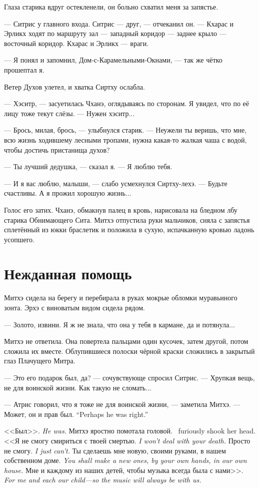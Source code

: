 Глаза старика вдруг остекленели, он больно схватил меня за запястье.

--- Ситрис у главного входа.
Ситрис --- друг, --- отчеканил он.
--- Кхарас и Эрликх ходят по маршруту зал --- западный коридор --- заднее крыло --- восточный коридор.
Кхарас и Эрликх --- враги.

--- Я понял и запомнил, Дом-с-Карамельными-Окнами, --- так же чётко прошептал я.

Ветер Духов улетел, и хватка Сиртху ослабла.

--- Хэситр, --- засуетилась Чханэ, оглядываясь по сторонам.
Я увидел, что по её лицу тоже текут слёзы.
--- Нужен хэситр...

--- Брось, милая, брось, --- улыбнулся старик.
--- Неужели ты веришь, что мне, всю жизнь ходившему лесными тропами, нужна какая-то жалкая чаша с водой, чтобы достичь пристанища духов?

--- Ты лучший дедушка, --- сказал я.
--- Я люблю тебя.

--- И я вас люблю, малыши, --- слабо усмехнулся Сиртху-лехэ.
--- Будьте счастливы.
А я прожил хорошую жизнь...

Голос его затих.
Чханэ, обмакнув палец в кровь, нарисовала на бледном лбу старика Обнимающего Сита.
Митхэ отпустила руки мальчиков, сняла с запястья сплетённый из юкки браслетик и положила в сухую, испачканную кровью ладонь усопшего.

\section{Нежданная помощь}

Митхэ сидела на берегу и перебирала в руках мокрые обломки муравьиного зонта.
Эрхэ с виноватым видом сидела рядом.

--- Золото, извини.
Я ж не знала, что она у тебя в кармане, да и потянула...

Митхэ не ответила.
Она повертела пальцами один кусочек, затем другой, потом сложила их вместе.
Облупившиеся полоски чёрной краски сложились в закрытый глаз Плачущего Митра.

--- Это его подарок был, да? --- сочувствующе спросил Ситрис.
--- Хрупкая вещь, не для воинской жизни.
Как такую не сломать...

--- Атрис говорил, что я тоже не для воинской жизни, --- заметила Митхэ.
{--- Может, он и прав был.}
{``Perhaps he was right.''}

{<<Был>>.}
{\textit{He was.}}
{Митхэ яростно помотала головой.}
{\Mitchoe\ furiously shook her head.}
{<<Я не смогу смириться с твоей смертью.}
{\textit{I won't deal with your death.}}
{Просто не смогу.}
{\textit{I just can't.}}
{Ты сделаешь мне новую, своими руками, в нашем собственном доме.}
{\textit{You shall make a new ones, by your own hands, in our own house.}}
{Мне и каждому из наших детей, чтобы музыка всегда была с нами>>.}
{\textit{For me and each our child---so the music will always be with us.}}

